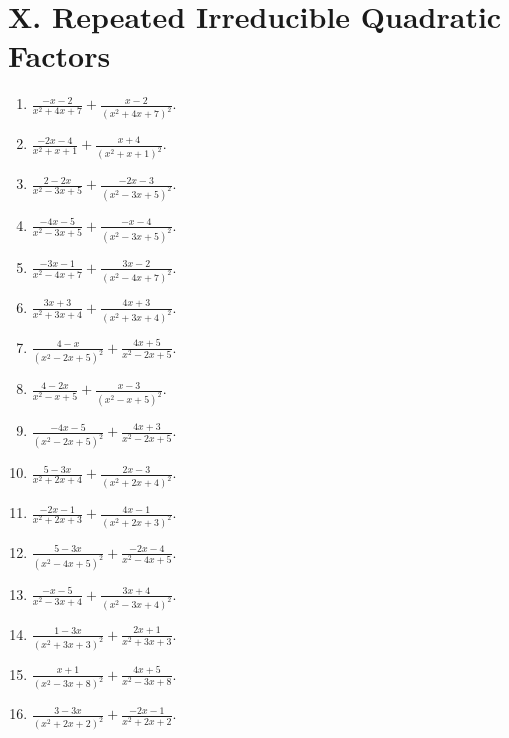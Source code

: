 \documentclass[11pt,oneside]{book}
\begin{document}
\section*{X. Repeated Irreducible Quadratic Factors}
\begin{enumerate}[leftmargin=*,label=\textbf{X\arabic*.},itemsep=0.45\baselineskip]
\item $\displaystyle \frac{- x - 2}{x^{2} + 4 x + 7} + \frac{x - 2}{\left(x^{2} + 4 x + 7\right)^{2}}$.
\item $\displaystyle \frac{- 2 x - 4}{x^{2} + x + 1} + \frac{x + 4}{\left(x^{2} + x + 1\right)^{2}}$.
\item $\displaystyle \frac{2 - 2 x}{x^{2} - 3 x + 5} + \frac{- 2 x - 3}{\left(x^{2} - 3 x + 5\right)^{2}}$.
\item $\displaystyle \frac{- 4 x - 5}{x^{2} - 3 x + 5} + \frac{- x - 4}{\left(x^{2} - 3 x + 5\right)^{2}}$.
\item $\displaystyle \frac{- 3 x - 1}{x^{2} - 4 x + 7} + \frac{3 x - 2}{\left(x^{2} - 4 x + 7\right)^{2}}$.
\item $\displaystyle \frac{3 x + 3}{x^{2} + 3 x + 4} + \frac{4 x + 3}{\left(x^{2} + 3 x + 4\right)^{2}}$.
\item $\displaystyle \frac{4 - x}{\left(x^{2} - 2 x + 5\right)^{2}} + \frac{4 x + 5}{x^{2} - 2 x + 5}$.
\item $\displaystyle \frac{4 - 2 x}{x^{2} - x + 5} + \frac{x - 3}{\left(x^{2} - x + 5\right)^{2}}$.
\item $\displaystyle \frac{- 4 x - 5}{\left(x^{2} - 2 x + 5\right)^{2}} + \frac{4 x + 3}{x^{2} - 2 x + 5}$.
\item $\displaystyle \frac{5 - 3 x}{x^{2} + 2 x + 4} + \frac{2 x - 3}{\left(x^{2} + 2 x + 4\right)^{2}}$.
\item $\displaystyle \frac{- 2 x - 1}{x^{2} + 2 x + 3} + \frac{4 x - 1}{\left(x^{2} + 2 x + 3\right)^{2}}$.
\item $\displaystyle \frac{5 - 3 x}{\left(x^{2} - 4 x + 5\right)^{2}} + \frac{- 2 x - 4}{x^{2} - 4 x + 5}$.
\item $\displaystyle \frac{- x - 5}{x^{2} - 3 x + 4} + \frac{3 x + 4}{\left(x^{2} - 3 x + 4\right)^{2}}$.
\item $\displaystyle \frac{1 - 3 x}{\left(x^{2} + 3 x + 3\right)^{2}} + \frac{2 x + 1}{x^{2} + 3 x + 3}$.
\item $\displaystyle \frac{x + 1}{\left(x^{2} - 3 x + 8\right)^{2}} + \frac{4 x + 5}{x^{2} - 3 x + 8}$.
\item $\displaystyle \frac{3 - 3 x}{\left(x^{2} + 2 x + 2\right)^{2}} + \frac{- 2 x - 1}{x^{2} + 2 x + 2}$.

\end{enumerate}
\end{document}
